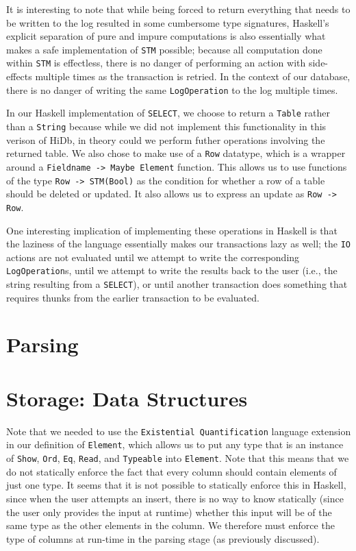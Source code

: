 \documentclass[10pt]{article}
\begin{document}
\begin{multicols}{2}
It is interesting to note that while being forced to return everything that needs to be written to the log resulted in some cumbersome type signatures, 
Haskell's explicit separation of pure and impure computations is also essentially what makes a safe implementation of \texttt{STM} possible; because all computation done within \texttt{STM} is effectless, there is no danger of performing an action with side-effects multiple times as the transaction is retried. In the context of our database, there is no danger of writing the same \texttt{LogOperation} to the log multiple times.

In our Haskell implementation of \texttt{SELECT}, we choose to return a \texttt{Table} rather than a \texttt{String} because while we did not implement this functionality in this verison of HiDb, in theory could we perform futher operations involving the returned table. We also chose to make use of a \texttt{Row} datatype, which is a wrapper around a \texttt{Fieldname -> Maybe Element} function. This allows us to use functions of the type \texttt{Row -> STM(Bool)} as the condition for whether a row of a table should be deleted or updated. It also allows us to express an update as \texttt{Row -> Row}. 

One interesting implication of implementing these operations in Haskell is that the laziness of the language essentially makes our transactions lazy as well; the \texttt{IO} actions are not evaluated until we attempt to write the corresponding \texttt{LogOperation}s, until we attempt to write the results back to the user (i.e., the string resulting from a \texttt{SELECT}), or until another transaction does something that requires thunks from the earlier transaction to be evaluated.
\section{Parsing}

\section{Storage: Data Structures}

Note that we needed to use the \texttt{Existential Quantification} language extension in our definition of \texttt{Element}, which allows us to put any type that is an instance of \texttt{Show}, \texttt{Ord}, \texttt{Eq}, \texttt{Read}, and \texttt{Typeable} into \texttt{Element}.  Note that this means that we do not statically enforce the fact that every column should contain elements of just one type. It seems that it is not possible to statically enforce this in Haskell, since when the user attempts an insert, there is no way to know statically (since the user only provides the input at runtime) whether this input will be of the same type as the other elements in the column. We therefore must enforce the type of columns at run-time in the parsing stage (as previously discussed).


\end{multicols}
\end{document}
